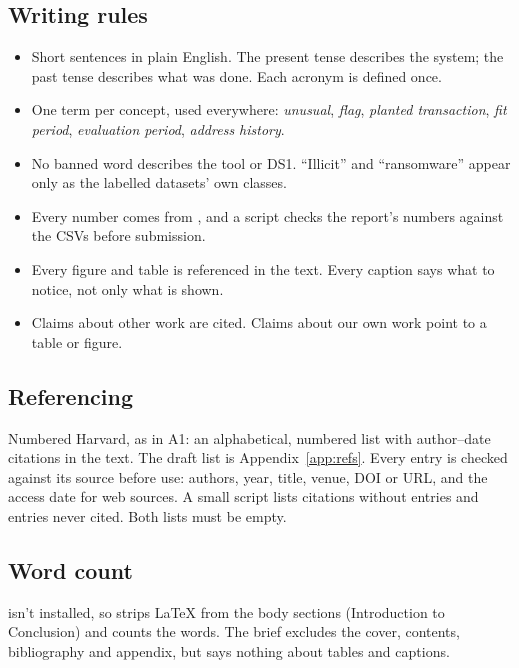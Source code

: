 \subsection{Writing rules}

\begin{itemize}
  \item Short sentences in plain English. The present tense describes the system; the past tense
    describes what was done. Each acronym is defined once.
  \item One term per concept, used everywhere: \emph{unusual}, \emph{flag}, \emph{planted
    transaction}, \emph{fit period}, \emph{evaluation period}, \emph{address history}.
  \item No banned word describes the tool or DS1. ``Illicit'' and ``ransomware'' appear only as
    the labelled datasets' own classes.
  \item Every number comes from , and a script checks the report's numbers
    against the CSVs before submission.
  \item Every figure and table is referenced in the text. Every caption says what to notice, not
    only what is shown.
  \item Claims about other work are cited. Claims about our own work point to a table or figure.
\end{itemize}

\subsection{Referencing}

Numbered Harvard, as in A1: an alphabetical, numbered list with author--date citations in the
text. The draft list is Appendix~\ref{app:refs}. Every entry is checked against its source before
use: authors, year, title, venue, DOI or URL, and the access date for web sources. A small script
lists citations without entries and entries never cited. Both lists must be empty.

\subsection{Word count}
\label{sec:wordcount}

 isn't installed, so  strips LaTeX from the body sections
(Introduction to Conclusion) and counts the words. The brief excludes the cover, contents,
bibliography and appendix, but says nothing about tables and captions.

